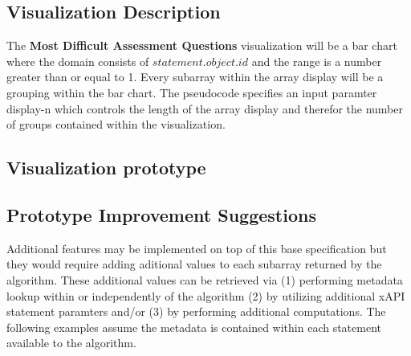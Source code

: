 \documentclass{article}
\begin{document}
\subsection{Visualization Description}
The \textbf{Most Difficult Assessment Questions} visualization will be
a bar chart where the domain consists of $statement.object.id$ and the
range is a number greater than or equal to 1. Every subarray within
the array display will be a grouping within the bar chart. The
pseudocode specifies an input paramter display-n which controls the
length of the array display and therefor the number of groups contained within
the visualization.


\subsection{Visualization prototype}



\subsection{Prototype Improvement Suggestions}
Additional features may be implemented on top of this base
specification but they would require adding aditional values to each
subarray returned by the algorithm. These additional values can be
retrieved via (1) performing metadata lookup within or independently of the
algorithm (2) by utilizing additional xAPI statement paramters and/or (3) by
performing additional computations. The following examples assume the
metadata is contained within each statement available to the algorithm.
\end{document}
